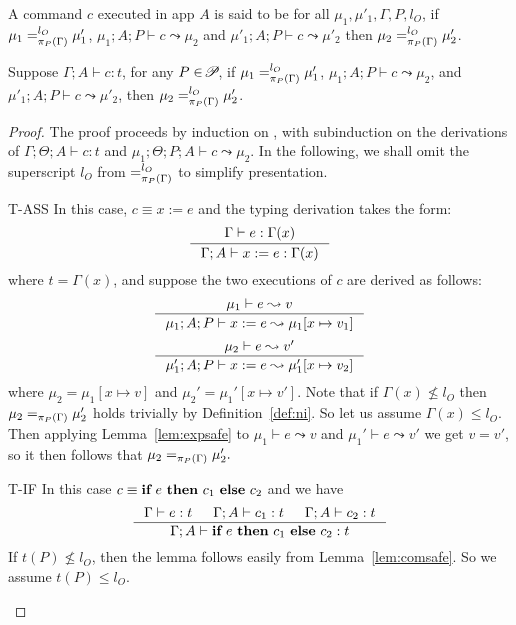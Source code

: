 {{{%


\begin{definition}\label{def:ni}
A command $c$ executed in app $A$ is said to be {} 
for all $\mu_1, \mu'_1,\Gamma, P, l_{O}$,
if  $\mu_1 =_{\pi_{{P}}({\Gamma})}^{l_{O}} \mu'_1$, \; $\mu_1;A ; P\vdash c \leadsto \mu_2 $ and
 $\mu'_1; A; P\vdash c\leadsto \mu'_2  $
then $\mu_2 =_{\pi_{{P}}({\Gamma})}^{l_{O}} \mu'_2$.
\end{definition}


\begin{lemma}\label{lem:comni}
Suppose $\Gamma; A\vdash c : t$, for any $P\in\!\mathscr{P}\!$, if  $\mu_1 =_{\pi_{{P}}({\Gamma})}^{l_{O}} \mu'_1$, $\mu_1; A; P \vdash c \leadsto \mu_2$,
and  $\mu'_1; A; P \vdash c \leadsto \mu'_2$,
then  $\mu_2 =_{\pi_{{P}}({\Gamma})}^{l_{O}} \mu'_2$.
\end{lemma}
\begin{proof}
The proof proceeds by induction on , with subinduction
on the derivations of $\Gamma;\Theta;A \vdash c : t$ and $\mu_1;\Theta;P;A\vdash c \leadsto \mu_2$.
In the following, we shall omit the superscript $l_O$ from
$=^{l_O}_{\pi_{{P}}({\Gamma})}$ to simplify presentation.

\begin{ProofEnumDesc}
\item[T-ASS] In this case, $c \equiv x := e$ and the typing derivation takes the form:
$$
\inference
{\Gamma \vdash e : \Gamma(x)}
{\Gamma ; A \vdash \lcASS{x}{e} : \Gamma(x)}
$$
where $t = \Gamma(x)$, and suppose the two executions
of $c$ are derived as follows:
$$
\inference{\mu_1 \vdash e \leadsto v}
{\mu_1; A; P \vdash \lcASS{x}{e} \leadsto \mu_1 [ x \mapsto v_1 ]}
$$
$$
\inference{\mu_2 \vdash e \leadsto v'}
{\mu_1'; A; P \vdash \lcASS{x}{e} \leadsto \mu_1' [ x \mapsto v_2 ]}
$$
where $\mu_2 = \mu_1[x \mapsto v]$
and $\mu_2' = \mu_1'[x \mapsto v'].$
Note that if $\Gamma(x) \not \leq l_O$ then
$\mu_2 =_{\pi_{{P}}({\Gamma})} \mu_2'$ holds trivially
by Definition~\ref{def:ni}.
So let us assume $\Gamma(x) \leq l_O$. Then applying Lemma~\ref{lem:expsafe}
to
$\mu_1 \vdash e \leadsto v$
and $\mu_1' \vdash e \leadsto v'$
we get
$v = v'$, so it then follows that  $\mu_2 =_{\pi_{{P}}({\Gamma})} \mu_2'.$
\item[T-IF] In this case $c \equiv {\textbf{if}~{e}~\textbf{then}~{c_1}~\textbf{else}~{c_2}}$ and we have
$$
\inference
{\Gamma \vdash e : t & \Gamma ; A\vdash c_1 : t & \Gamma; A \vdash c_2 : t }
{\Gamma; A \vdash \lcIF{e}{c_1}{c_2} : t}
$$
If $t(P)\not\leq l_{O}$, then the lemma follows easily from
Lemma~\ref{lem:comsafe}. So we assume $t(P) \leq l_O.$


\end{ProofEnumDesc}
\end{proof}}}}
